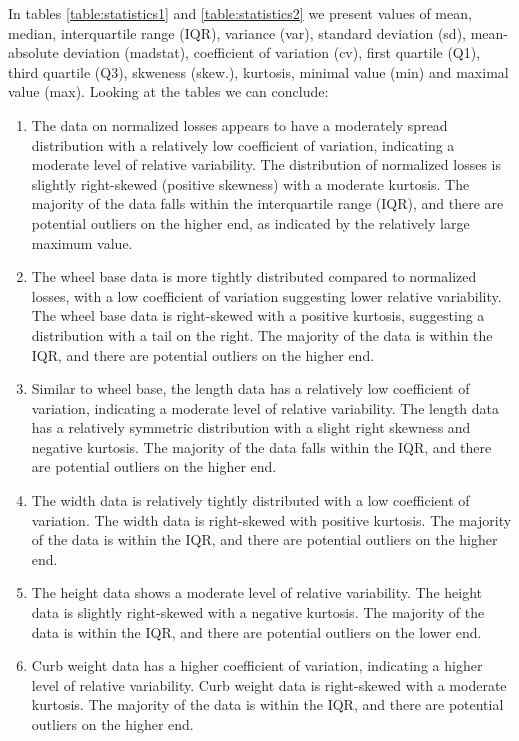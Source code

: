 \documentclass[11pt,a4paper]{article}\usepackage[]{graphicx}\usepackage[]{xcolor}
\begin{document}
	In tables \ref{table:statistics1} and \ref{table:statistics2} we present values of mean, median, interquartile range (IQR), variance (var), standard deviation (sd), mean-absolute deviation (madstat), coefficient of variation (cv), first quartile (Q1), third quartile (Q3), skweness (skew.), kurtosis, minimal value (min) and maximal value (max). Looking at the tables we can conclude:
	\begin{enumerate}
	\item The data on normalized losses appears to have a moderately spread distribution with a relatively low coefficient of variation, indicating a moderate level of relative variability. The distribution of normalized losses is slightly right-skewed (positive skewness) with a moderate kurtosis. The majority of the data falls within the interquartile range (IQR), and there are potential outliers on the higher end, as indicated by the relatively large maximum value.
	
	\item The wheel base data is more tightly distributed compared to normalized losses, with a low coefficient of variation suggesting lower relative variability. The wheel base data is right-skewed with a positive kurtosis, suggesting a distribution with a tail on the right. The majority of the data is within the IQR, and there are potential outliers on the higher end.
	
	\item Similar to wheel base, the length data has a relatively low coefficient of variation, indicating a moderate level of relative variability. The length data has a relatively symmetric distribution with a slight right skewness and negative kurtosis. The majority of the data falls within the IQR, and there are potential outliers on the higher end.
	
	
	\item The width data is relatively tightly distributed with a low coefficient of variation. The width data is right-skewed with positive kurtosis. The majority of the data is within the IQR, and there are potential outliers on the higher end.
	
	
	\item The height data shows a moderate level of relative variability. The height data is slightly right-skewed with a negative kurtosis. The majority of the data is within the IQR, and there are potential outliers on the lower end.
	
	
	\item Curb weight data has a higher coefficient of variation, indicating a higher level of relative variability. Curb weight data is right-skewed with a moderate kurtosis. The majority of the data is within the IQR, and there are potential outliers on the higher end.
	

\end{enumerate}
\end{document}
